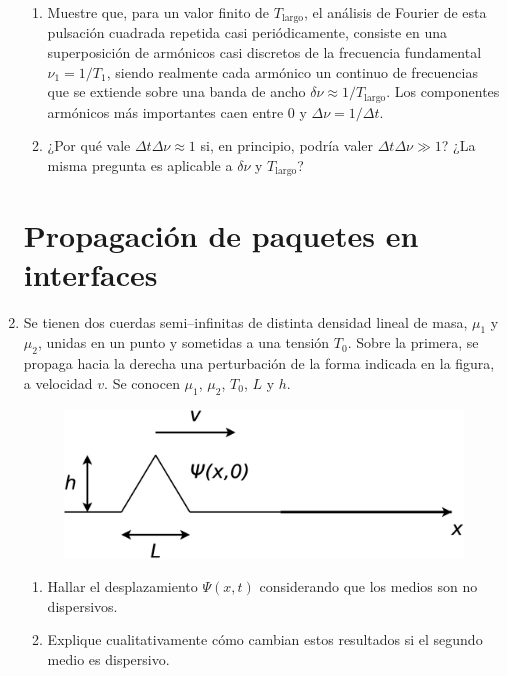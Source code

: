 \documentclass[11pt,spanish]{article}
\begin{document}
\begin{enumerate}
\begin{enumerate}
        \item Muestre que, para un valor finito de $T_\text{largo}$, el análisis
        de Fourier de esta pulsación cuadrada repetida casi periódicamente,
        consiste en una superposición de armónicos casi discretos de la
        frecuencia fundamental $\nu_{1}=1/T_{1}$, siendo realmente cada armónico
        un continuo de frecuencias que se extiende sobre una banda de ancho
        $\delta\nu\approx1/T_\text{largo}$. Los componentes armónicos más
        importantes caen entre 0 y $\Delta\nu=1/\Delta t$.

        \item ¿Por qué vale $\Delta t\Delta\nu\approx1$ si, en principio, podría
        valer $\Delta t\Delta\nu\gg1$? ¿La misma pregunta es aplicable a
        $\delta\nu$ y $T_\text{largo}$?
    \end{enumerate}


\section*{Propagación de paquetes en interfaces}


	\item Se tienen dos cuerdas semi--infinitas de distinta densidad lineal
	de masa, $\mu_{1}$ y $\mu_{2}$, unidas en un punto y sometidas
	a una tensión $T_0$. Sobre la primera, se propaga hacia la derecha una
	perturbación de la forma indicada en la figura, a velocidad $v$. Se conocen
    $\mu_{1}$, $\mu_{2}$, $T_0$, $L$ y $h$.

	\begin{figure}[H]
		\centering{}\includegraphics[clip,scale=0.25]{figs/ej2-20}
	\end{figure}

	\begin{enumerate}
		\item Hallar el desplazamiento $\Psi(x,t)$ considerando que los medios
    	son no dispersivos.

		\item Explique cualitativamente cómo cambian estos resultados si el
        segundo medio es dispersivo.
	\end{enumerate}
    
\end{enumerate}
\end{document}
